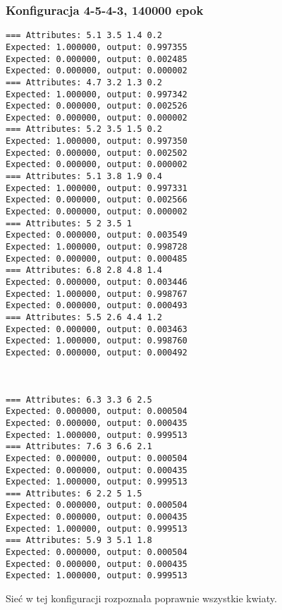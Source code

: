 \documentclass{classrep}
\begin{document}
\subsubsection{Konfiguracja 4-5-4-3, 140000 epok}
\begin{lstlisting}[basicstyle=\small]
=== Attributes: 5.1 3.5 1.4 0.2 
Expected: 1.000000, output: 0.997355
Expected: 0.000000, output: 0.002485
Expected: 0.000000, output: 0.000002
=== Attributes: 4.7 3.2 1.3 0.2 
Expected: 1.000000, output: 0.997342
Expected: 0.000000, output: 0.002526
Expected: 0.000000, output: 0.000002
=== Attributes: 5.2 3.5 1.5 0.2 
Expected: 1.000000, output: 0.997350
Expected: 0.000000, output: 0.002502
Expected: 0.000000, output: 0.000002
=== Attributes: 5.1 3.8 1.9 0.4 
Expected: 1.000000, output: 0.997331
Expected: 0.000000, output: 0.002566
Expected: 0.000000, output: 0.000002
=== Attributes: 5 2 3.5 1 
Expected: 0.000000, output: 0.003549
Expected: 1.000000, output: 0.998728
Expected: 0.000000, output: 0.000485
=== Attributes: 6.8 2.8 4.8 1.4 
Expected: 0.000000, output: 0.003446
Expected: 1.000000, output: 0.998767
Expected: 0.000000, output: 0.000493
=== Attributes: 5.5 2.6 4.4 1.2 
Expected: 0.000000, output: 0.003463
Expected: 1.000000, output: 0.998760
Expected: 0.000000, output: 0.000492



=== Attributes: 6.3 3.3 6 2.5 
Expected: 0.000000, output: 0.000504
Expected: 0.000000, output: 0.000435
Expected: 1.000000, output: 0.999513
=== Attributes: 7.6 3 6.6 2.1 
Expected: 0.000000, output: 0.000504
Expected: 0.000000, output: 0.000435
Expected: 1.000000, output: 0.999513
=== Attributes: 6 2.2 5 1.5 
Expected: 0.000000, output: 0.000504
Expected: 0.000000, output: 0.000435
Expected: 1.000000, output: 0.999513
=== Attributes: 5.9 3 5.1 1.8 
Expected: 0.000000, output: 0.000504
Expected: 0.000000, output: 0.000435
Expected: 1.000000, output: 0.999513
\end{lstlisting}

Sieć w tej konfiguracji rozpoznała poprawnie wszystkie kwiaty.
\end{document}
